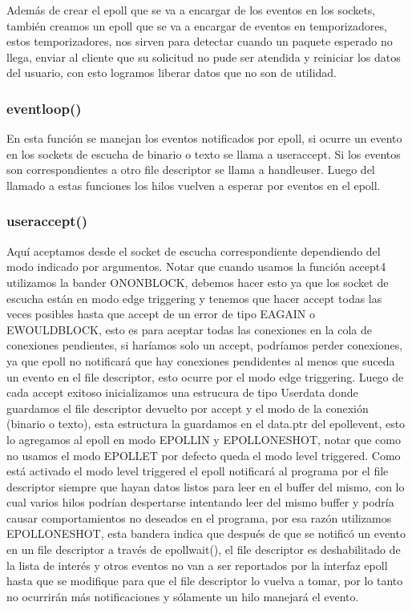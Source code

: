 \documentclass{article}
\begin{document}
Además de crear el epoll que se va a encargar de los eventos
en los sockets, también creamos un epoll que se va a encargar
de eventos en temporizadores, estos temporizadores, nos sirven
para detectar cuando un paquete esperado no llega, enviar
al cliente que su solicitud no pude ser atendida y reiniciar
los datos del usuario, con esto logramos liberar datos
que no son de utilidad.

\subsubsection{eventloop()}
En esta función se manejan los eventos notificados por epoll,
si ocurre un evento en los sockets de escucha de binario
o texto se llama a user\textunderscore accept. Si los
eventos son correspondientes a otro file descriptor se
llama a handle\textunderscore user. Luego del llamado
a estas funciones los hilos vuelven a esperar por eventos
en el epoll.

\subsubsection{user\textunderscore accept()}
Aquí aceptamos desde el socket de escucha correspondiente
dependiendo del modo indicado por argumentos. Notar que
cuando usamos la función accept4 utilizamos la bander
O\textunderscore NONBLOCK, debemos hacer esto ya que
los socket de escucha están en modo edge triggering y
tenemos que hacer accept todas las veces posibles hasta
que accept de un error de tipo EAGAIN o EWOULDBLOCK,
esto es para aceptar todas las conexiones en la cola de 
conexiones pendientes, si haríamos solo un accept,
podríamos perder conexiones, ya que epoll no notificará
que hay conexiones pendidentes al menos que suceda
un evento en el file descriptor, esto ocurre por el
modo edge triggering. Luego de cada accept exitoso
inicializamos una estrucura de tipo 
User\textunderscore data donde guardamos el file 
descriptor devuelto por accept y el modo de la
conexión (binario o texto), esta estructura
la guardamos en el data.ptr del 
epoll\textunderscore event, esto lo agregamos
al epoll en modo EPOLLIN y EPOLLONESHOT, notar
que como no usamos el modo EPOLLET por defecto
queda el modo level triggered. Como está activado
el modo level triggered el epoll notificará al 
programa por el file descriptor siempre que hayan
datos listos para leer en el buffer del mismo, con
lo cual varios hilos podrían despertarse intentando
leer del mismo buffer y podría causar comportamientos
no deseados en el programa, por esa razón utilizamos
EPOLLONESHOT, esta bandera indica que después de que se
notificó un evento en un file descriptor a través de
epoll\textunderscore wait(), el file descriptor es 
deshabilitado de la lista de interés y otros eventos no
van a ser reportados por la interfaz epoll hasta que
se modifique para que el file descriptor lo vuelva a tomar,
por lo tanto no ocurrirán más notificaciones y sólamente
un hilo manejará el evento.
\end{document}
